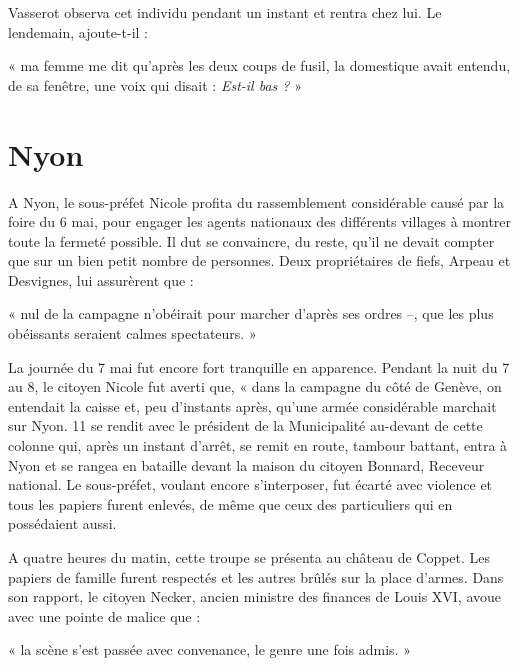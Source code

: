 \documentclass[french,twoside]{book} %
\newenvironment{quoteblock}%
  {\begin{quoting}}
  {\end{quoting}}
\newenvironment{quotebar}{%
    \def\FrameCommand{{\color{rubric!10!}\vrule width 0.5em} \hspace{0.9em}}%
    \def\OuterFrameSep{\itemsep} %
    \MakeFramed {\advance\hsize-\width \FrameRestore}
  }%
  {%
    \endMakeFramed
  }
\renewenvironment{quoteblock}%
  {%
    \savenotes
    \setstretch{0.9}
    \begin{quotebar}
  }
  {%
    \end{quotebar}
    \spewnotes
  }
\begin{document}
\noindent Vasserot observa cet individu pendant un instant et rentra chez lui. Le lendemain, ajoute-t-il :\par

\begin{quoteblock}
\noindent « ma femme me dit qu’après les deux coups de fusil, la domestique avait entendu, de sa fenêtre, une voix qui disait : \emph{Est-il bas ?} »\end{quoteblock}

\section[Nyon]{Nyon}
\noindent A Nyon, le sous-préfet Nicole profita du rassemblement considérable causé par la foire du 6 mai, pour engager les agents nationaux des différents villages à montrer toute la fermeté possible. Il dut se convaincre, du reste, qu’il ne devait compter que sur un bien petit nombre de personnes. Deux propriétaires de fiefs, Arpeau et Desvignes, lui assurèrent que :\par

\begin{quoteblock}
\noindent « nul de la campagne n’obéirait pour marcher d’après ses ordres –, que les plus obéissants seraient calmes spectateurs. »\end{quoteblock}

\noindent La journée du 7 mai fut encore fort tranquille en apparence. Pendant la nuit du 7 au 8, le citoyen Nicole fut averti que, « dans la campagne du côté de Genève, on entendait la caisse et, peu d’instants après, qu’une armée considérable marchait sur Nyon. 11 se rendit avec le président de la Municipalité au-devant de cette colonne qui, après un instant d’arrêt, se remit en route, tambour battant, entra à Nyon et se rangea en bataille devant la maison du citoyen Bonnard, Receveur national. Le sous-préfet, voulant encore s’interposer, fut écarté avec violence et tous les papiers furent enlevés, de même que ceux des particuliers qui en possédaient aussi.\par
A quatre heures du matin, cette troupe se présenta au château de Coppet. Les papiers de famille furent respectés et les autres brûlés sur la place d’armes. Dans son rapport, le citoyen Necker, ancien ministre des finances de Louis XVI, avoue avec une pointe de malice que :\par

\begin{quoteblock}
\noindent « la scène s’est passée avec convenance, le genre une fois admis. »\end{quoteblock}
\end{document}
